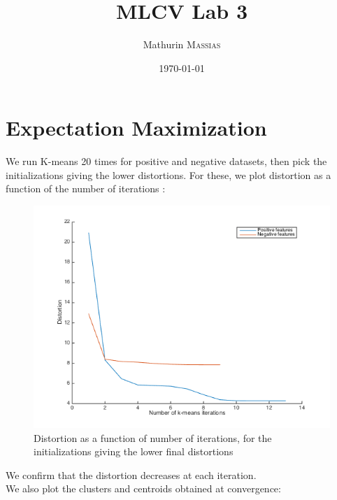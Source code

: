 \documentclass[a4paper, 12pt]{article}
\begin{document}
 
\title{MLCV Lab 3}
\author{Mathurin \textsc{Massias}}
\date{\today} 
 
\maketitle

\section{Expectation Maximization}

We run K-means 20 times for positive and negative datasets, then pick the initializations giving the lower distortions. For these, we plot distortion as a function of the number of iterations :
\begin{figure}[H]
	\centering
	\noindent\includegraphics[scale=0.6]{distortion.png}
	\caption{Distortion as a function of number of iterations, for the initializations giving the lower final distortions}
\end{figure}
We confirm that the distortion decreases at each iteration.
\\We also plot the clusters and centroids obtained at convergence:
\end{document}
